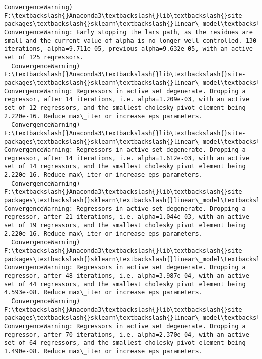 \documentclass[11pt]{article}
\begin{document}
\begin{Verbatim}[commandchars=\\\{\}]
  ConvergenceWarning)
F:\textbackslash{}Anaconda3\textbackslash{}lib\textbackslash{}site-packages\textbackslash{}sklearn\textbackslash{}linear\_model\textbackslash{}least\_angle.py:339: ConvergenceWarning: Early stopping the lars path, as the residues are small and the current value of alpha is no longer well controlled. 130 iterations, alpha=9.711e-05, previous alpha=9.632e-05, with an active set of 125 regressors.
  ConvergenceWarning)
F:\textbackslash{}Anaconda3\textbackslash{}lib\textbackslash{}site-packages\textbackslash{}sklearn\textbackslash{}linear\_model\textbackslash{}least\_angle.py:313: ConvergenceWarning: Regressors in active set degenerate. Dropping a regressor, after 14 iterations, i.e. alpha=1.209e-03, with an active set of 12 regressors, and the smallest cholesky pivot element being 2.220e-16. Reduce max\_iter or increase eps parameters.
  ConvergenceWarning)
F:\textbackslash{}Anaconda3\textbackslash{}lib\textbackslash{}site-packages\textbackslash{}sklearn\textbackslash{}linear\_model\textbackslash{}least\_angle.py:313: ConvergenceWarning: Regressors in active set degenerate. Dropping a regressor, after 14 iterations, i.e. alpha=1.612e-03, with an active set of 14 regressors, and the smallest cholesky pivot element being 2.220e-16. Reduce max\_iter or increase eps parameters.
  ConvergenceWarning)
F:\textbackslash{}Anaconda3\textbackslash{}lib\textbackslash{}site-packages\textbackslash{}sklearn\textbackslash{}linear\_model\textbackslash{}least\_angle.py:313: ConvergenceWarning: Regressors in active set degenerate. Dropping a regressor, after 21 iterations, i.e. alpha=1.044e-03, with an active set of 19 regressors, and the smallest cholesky pivot element being 2.220e-16. Reduce max\_iter or increase eps parameters.
  ConvergenceWarning)
F:\textbackslash{}Anaconda3\textbackslash{}lib\textbackslash{}site-packages\textbackslash{}sklearn\textbackslash{}linear\_model\textbackslash{}least\_angle.py:313: ConvergenceWarning: Regressors in active set degenerate. Dropping a regressor, after 48 iterations, i.e. alpha=3.987e-04, with an active set of 44 regressors, and the smallest cholesky pivot element being 4.593e-08. Reduce max\_iter or increase eps parameters.
  ConvergenceWarning)
F:\textbackslash{}Anaconda3\textbackslash{}lib\textbackslash{}site-packages\textbackslash{}sklearn\textbackslash{}linear\_model\textbackslash{}least\_angle.py:313: ConvergenceWarning: Regressors in active set degenerate. Dropping a regressor, after 70 iterations, i.e. alpha=2.370e-04, with an active set of 64 regressors, and the smallest cholesky pivot element being 1.490e-08. Reduce max\_iter or increase eps parameters.

\end{Verbatim}
\end{document}
